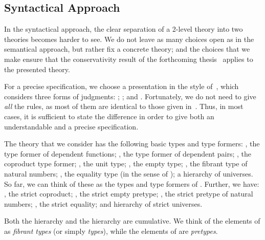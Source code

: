 \documentclass[a4paper,reqno]{amsart}
\newcommand{\N}{\ensuremath{\mathbb{N}}\xspace}
\theoremstyle{plain}
\theoremstyle{definition}
\begin{document}
\newcommand{\steq}{\stackrel{s}{=}}
\newcommand{\ctx}{\mathrm{ctx}}



\subsection{Syntactical Approach}

In the syntactical approach, the clear separation of a 2-level theory into two theories becomes harder to see.
We do not leave as many choices open as in the semantical approach, but rather fix a concrete theory; and the choices that we make ensure that the conservativity result of the forthcoming thesis~\cite{paolo:thesis} applies to the presented theory.

For a precise specification, we choose a presentation in the style of~\cite[Appendix A.2]{HoTTbook}, which considers three forms of judgments: ; ; and .
Fortunately, we do not need to give \emph{all} the rules, as most of them are identical to those given in~\cite[Appendix A.2]{HoTTbook}. 
Thus, in most cases, it is sufficient to state the difference in order to give both an understandable and a precise specification.

\newcommand{\strictN}{\N^s}

The theory that we consider has the following basic types and type formers: 
, the type former of dependent functions;
, the type former of dependent pairs;
, the coproduct type former;
, the unit type;
, the empty type;
, the fibrant type of natural numbers;
, the equality type (in the sense of );
a hierarchy  of universes.
So far, we can think of these as the types and type formers of .
Further, we have:
, the strict coproduct;
, the strict empty pretype;
, the strict pretype of natural numbers;
, the strict equality;
and hierarchy  of strict universes.

Both the hierarchy  and the hierarchy  are cumulative.
We think of the elements of  as \emph{fibrant types} (or simply \emph{types}), while the elements of  are \emph{pretypes}.
\end{document}
